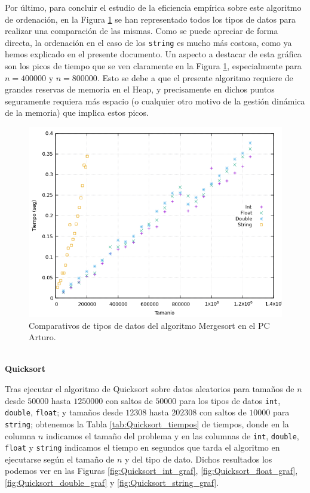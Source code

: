 \documentclass[12pt]{article}
\begin{document}
    Por último, para concluir el estudio de la eficiencia empírica sobre este algoritmo de ordenación, en la Figura \ref{fig:ComparativaMergesortDatos} se han representado todos los tipos de datos para realizar una comparación de las mismas. Como se puede apreciar de forma directa, la ordenación en el caso de los \verb|string| es mucho más costosa, como ya hemos explicado en el presente documento. Un aspecto a destacar de esta gráfica son los picos de tiempo que se ven claramente en la Figura \ref{fig:ComparativaMergesortDatos}, especialmente para $n=400000$ y $n=800000$. Esto se debe a que el presente algoritmo requiere de grandes reservas de memoria en el Heap, y precisamente en dichos puntos seguramente requiera más espacio (o cualquier otro motivo de la gestión dinámica de la memoria) que implica estos picos.    
    \begin{figure}
        \centering
        \includegraphics[width=0.8\linewidth]{images/Mergesort/Mergesort_Comparacion.png}
        \caption{Comparativos de tipos de datos del algoritmo Mergesort en el PC Arturo.}
        \label{fig:ComparativaMergesortDatos}
    \end{figure}\\
    
    \textbf{Quicksort}
    
    Tras ejecutar el algoritmo de Quicksort sobre datos aleatorios para tamaños de $n$ desde $50000$ hasta $1250000$ con saltos de $50000$ para los tipos de datos \verb|int|, \verb|double|, \verb|float|; y tamaños desde $12308$ hasta $202308$ con saltos de $10000$ para \verb|string|; obtenemos la Tabla \ref{tab:Quicksort_tiempos} de tiempos, donde en la columna $n$ indicamos el tamaño del problema y en las columnas de \verb|int|, \verb|double|, \verb|float| y \verb|string| indicamos el tiempo en segundos que tarda el algoritmo en ejecutarse según el tamaño de $n$ y del tipo de dato. Dichos resultados los podemos ver en las Figuras \ref{fig:Quicksort_int_graf}, \ref{fig:Quicksort_float_graf}, \ref{fig:Quicksort_double_graf} y \ref{fig:Quicksort_string_graf}.
\end{document}
